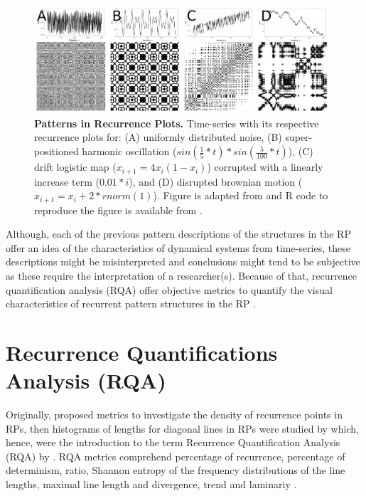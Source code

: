 \begin{figure}
  \centering
    \includegraphics[width=1.0\textwidth]{rpsp}
    \caption{
	{\bf Patterns in Recurrence Plots.} 
	Time-series with its respective recurrence plots for:
	(A) uniformly distributed noise,
	(B) super-positioned harmonic oscillation ($sin( \frac{1}{5}*t) * sin( \frac{5}{100}*t) $),
	(C) drift logistic map ($x_{i+1} = 4 x_i (1- x_i) $) corrupted with a linearly increase term ($0.01*i$), and
	(D) disrupted brownian motion  ($x_{i+1} = x_i + 2*rnorm(1) $).
	Figure is adapted from \cite{marwan2015} and R code to reproduce the figure is available from \cite{hwum2018}.
	}
    \label{fig:rp2}
\end{figure}

Although, each of the previous pattern descriptions of the structures in the RP offer 
an idea of the characteristics of dynamical systems from time-series, these descriptions 
might be misinterpreted and conclusions might tend to be subjective as these require 
the interpretation of a researcher(s).
Because of that, recurrence quantification analysis (RQA) offer objective
metrics to quantify the visual characteristics of recurrent 
pattern structures in the RP \cite{zbilut1992}.



\section{Recurrence Quantifications Analysis (RQA)}
Originally, \cite{zbilut1992} proposed metrics to investigate the density of 
recurrence points in RPs, then histograms of lengths for diagonal lines in RPs were 
studied by \cite{trulla1996} which, hence, were the introduction to the term Recurrence 
Quantification Analysis (RQA) by \cite{marwan2008}. 
RQA metrics comprehend percentage of recurrence, percentage of determinism, 
ratio, Shannon entropy of the frequency distributions of the line lengths,
maximal line length and divergence, trend and laminariy \cite{marwan2007, marwan2015}.



